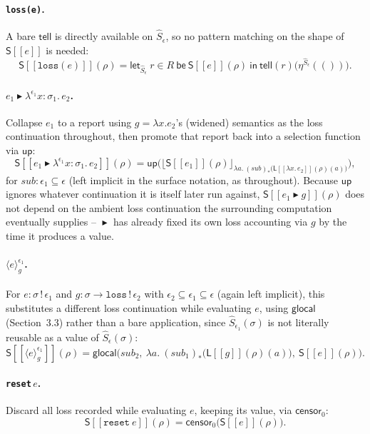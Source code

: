 \documentclass[11pt]{article}
\theoremstyle{plain}
\newcommand{\Ssem}[1]{\mathsf{S}[\![#1]\!]}
\newcommand{\Lsem}[1]{\mathsf{L}[\![#1]\!]}
\newcommand{\Sm}[1]{\widehat{S}_{#1}}
\newcommand{\eps}{\epsilon}
\newcommand{\then}{\mathrel{\blacktriangleright}}
\newcommand{\loc}[1]{\langle #1 \rangle} %
\newcommand{\tell}{\mathsf{tell}}
\newcommand{\censor}{\mathsf{censor}_0}
\newcommand{\up}{\mathsf{up}}
\newcommand{\glocalOp}{\mathsf{glocal}}
\newcommand{\rpt}[2]{\lfloor #1\rfloor_{#2}}
\begin{document}
\paragraph{\texttt{loss(e)}.} A bare $\tell$ is directly available on $\Sm\eps$, so no
pattern matching on the shape of $\Ssem e$ is needed:
\[
  \Ssem{\mathtt{loss}(e)}(\rho) = \mathsf{let}_{\Sm\eps}\ r\in R\ \mathsf{be}\ \Ssem{e}(\rho)\ \mathsf{in}\ \tell(r)\big(\eta^{\Sm\eps}(())\big).
\]

\paragraph{$e_1\then\lambda^{\eps_1} x{:}\sigma_1.\,e_2$.} Collapse $e_1$ to a report using
$g=\lambda x.e_2$'s (widened) semantics as the loss continuation throughout, then promote
that report back into a selection function via $\up$:
\[
  \Ssem{e_1\then\lambda^{\eps_1}x{:}\sigma_1.\,e_2}(\rho) = \up\Big(\rpt{\Ssem{e_1}(\rho)}{\lambda a.\ (\mathit{sub})_*\big(\Lsem{\lambda x.\,e_2}(\rho)(a)\big)}\Big),
\]
for $\mathit{sub}:\eps_1\subseteq\eps$ (left implicit in the surface notation, as
throughout). Because $\up$ ignores whatever continuation it is itself later run against,
$\Ssem{e_1\then g}(\rho)$ does not depend on the ambient loss continuation the surrounding
computation eventually supplies -- $\then$ has already fixed its own loss accounting via
$g$ by the time it produces a value.

\paragraph{$\loc{e}_g^{\eps_1}$.} For $e:\sigma\,!\,\eps_1$ and $g:\sigma\to\mathtt{loss}\,!\,\eps_2$
with $\eps_2\subseteq\eps_1\subseteq\eps$ (again left implicit), this substitutes a
different loss continuation while evaluating $e$, using $\glocalOp$ (Section~3.3) rather
than a bare application, since $\Sm{\eps_1}(\sigma)$ is not literally reusable as a value of
$\Sm\eps(\sigma)$:
\[
  \Ssem{\loc{e}_g^{\eps_1}}(\rho) = \glocalOp\Big(\mathit{sub}_2,\ \lambda a.\ (\mathit{sub}_1)_*\big(\Lsem g(\rho)(a)\big),\ \Ssem e(\rho)\Big).
\]

\paragraph{\texttt{reset}\,$e$.} Discard all loss recorded while evaluating $e$, keeping
its value, via $\censor$:
\[
  \Ssem{\mathtt{reset}\ e}(\rho) = \censor\big(\Ssem e(\rho)\big).
\]
\end{document}

